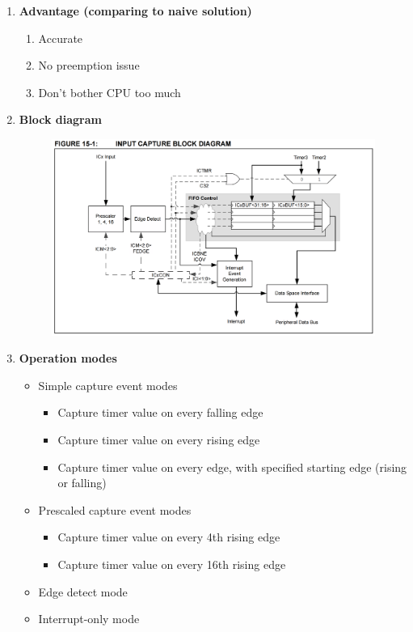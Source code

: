 \documentclass[a4paper]{article}
\begin{document}
	\begin{enumerate}[label = \arabic*.]
		\item \textbf{Advantage (comparing to naive solution)}
			\begin{enumerate}[label = \arabic*.]
				\item Accurate
				\item No preemption issue
				\item Don't bother CPU too much
			\end{enumerate}

		\item \textbf{Block diagram}
			\begin{figure}[H]
				\centering
				\includegraphics[width=0.9\linewidth]{Input_capture_block_diagram.png}
				\label{fig:Input_capture_block_diagram.png}
			\end{figure}

		\item \textbf{Operation modes}
			\begin{itemize}[leftmargin = 1cm]
				\item Simple capture event modes
					\begin{itemize}[leftmargin = 1cm]
						\item Capture timer value on every falling edge
						\item Capture timer value on every rising edge
						\item Capture timer value on every edge, with specified starting edge (rising or falling)
					\end{itemize}
				\item Prescaled capture event modes
					\begin{itemize}[leftmargin = 1cm]
						\item Capture timer value on every 4th rising edge
						\item Capture timer value on every 16th rising edge
					\end{itemize}
				\item Edge detect mode
				\item Interrupt-only mode
			\end{itemize}


\end{enumerate}
\end{document}
